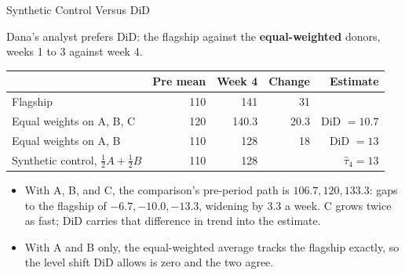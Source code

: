 \documentclass[aspectratio=169, 11pt, handout]{beamer}
\newcommand{\hatt}{\hat{\tau}}
\begin{document}
\begin{frame}{Synthetic Control Versus DiD}

Dana's analyst prefers DiD: the flagship against the \textbf{equal-weighted} donors, weeks 1 to 3 against week 4.

\begin{center}
\small
\begin{tabular}{lrrrr}
\toprule
& \textbf{Pre mean} & \textbf{Week 4} & \textbf{Change} & \textbf{Estimate} \\
\midrule
Flagship & 110 & 141 & 31 & \\
Equal weights on A, B, C & 120 & 140.3 & 20.3 & DiD $= 10.7$ \\
Equal weights on A, B & 110 & 128 & 18 & DiD $= 13$ \\
Synthetic control, $\tfrac12 A + \tfrac12 B$ & 110 & 128 & & $\hatt_4 = 13$ \\
\bottomrule
\end{tabular}
\end{center}

\begin{itemize}
  \item With A, B, and C, the comparison's pre-period path is $106.7, 120, 133.3$: gaps to the flagship of $-6.7, -10.0, -13.3$, widening by 3.3 a week. C grows twice as fast; DiD carries that difference in trend into the estimate.
  \item With A and B only, the equal-weighted average tracks the flagship exactly, so the level shift DiD allows is zero and the two agree.
\end{itemize}

\end{frame}
\end{document}
